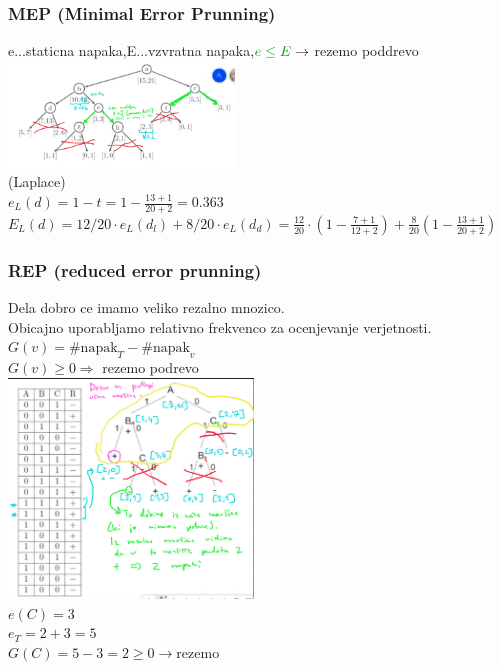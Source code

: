 \subsubsection{MEP (Minimal Error Prunning)}
e...staticna napaka,E...vzvratna napaka,$\green{e\leq E} \rightarrow$ rezemo poddrevo\\
\includegraphics[width=6cm]{./images/mep.png}\\
(Laplace)\\
$e_L(d)=1-t=1-\frac{13+1}{20+2}=0.363$\\
$E_L(d)=12/20\cdot e_L(d_l) + 8/20\cdot e_L(d_d)= \frac{12}{20} \cdot(1-\frac{7+1}{12+2})+\frac{8}{20}(1-\frac{13+1}{20+2})$\\

\subsubsection{REP (reduced error prunning)} 
Dela dobro ce imamo veliko rezalno mnozico.\\
Obicajno uporabljamo relativno frekvenco za ocenjevanje verjetnosti.\\
$G(v)=\#\text{napak}_T-\#\text{napak}_v$\\
$G(v)\geq 0 \Rightarrow$ rezemo podrevo\\
\includegraphics[width=6.5cm]{./images/rep.png}\\
$e(C)=3$\\
$e_T=2+3=5$\\
$G(C)=5-3=2\geq0 \rightarrow \text{rezemo}$


